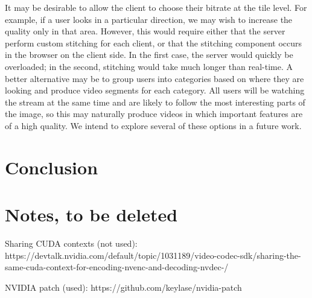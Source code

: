 It may be desirable to allow the client to choose their bitrate at the tile level. For example, if a user looks in a particular direction, we may wish to increase the quality only in that area. However, this would require either that the server perform custom stitching for each client, or that the stitching component occurs in the browser on the client side. In the first case, the server would quickly be overloaded; in the second, stitching would take much longer than real-time. A better alternative may be to group users into categories based on where they are looking and produce video segments for each category. All users will be watching the stream at the same time and are likely to follow the most interesting parts of the image, so this may naturally produce videos in which important features are of a high quality. We intend to explore several of these options in a future work.

\section{Conclusion}

\section{Notes, to be deleted}
Sharing CUDA contexts (not used): https://devtalk.nvidia.com/default/topic/1031189/video-codec-sdk/sharing-the-same-cuda-context-for-encoding-nvenc-and-decoding-nvdec-/

NVIDIA patch (used): https://github.com/keylase/nvidia-patch
